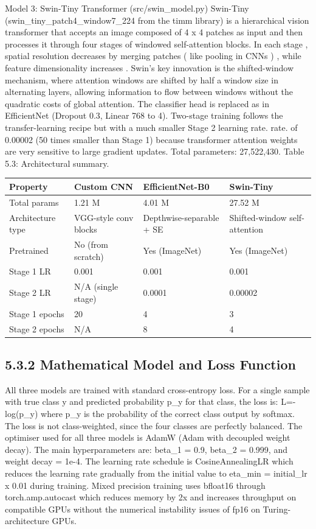 \documentclass[12pt,a4paper,oneside]{report}
\begin{document}
Model 3: Swin-Tiny Transformer (src/swin\_model.py)
Swin-Tiny (swin\_tiny\_patch4\_window7\_224 from the timm library) is a hierarchical vision transformer that accepts an image composed of 4 x 4 patches as input and then processes it through four stages of windowed self-attention blocks. In each stage , spatial resolution decreases by merging patches ( like pooling in CNNs ) , while feature dimensionality increases . Swin's key innovation is the shifted-window mechanism, where attention windows are shifted by half a window size in alternating layers, allowing information to flow between windows without the quadratic costs of global attention.
The classifier head is replaced as in EfficientNet (Dropout 0.3, Linear 768 to 4). Two-stage training follows the transfer-learning recipe but with a much smaller Stage 2 learning rate. rate. of 0.00002 (50 times smaller than Stage 1) because transformer attention weights are very sensitive to large gradient updates. Total parameters: 27,522,430.
Table 5.3: Architectural summary.
\begin{center}
\small
\begin{tabularx}{\textwidth}{YYYY}
\toprule
\textbf{Property} & \textbf{Custom CNN} & \textbf{EfficientNet-B0} & \textbf{Swin-Tiny} \\
\midrule
Total params & 1.21 M & 4.01 M & 27.52 M \\
Architecture type & VGG-style conv blocks & Depthwise-separable + SE & Shifted-window self-attention \\
Pretrained & No (from scratch) & Yes (ImageNet) & Yes (ImageNet) \\
Stage 1 LR & 0.001 & 0.001 & 0.001 \\
Stage 2 LR & N/A (single stage) & 0.0001 & 0.00002 \\
Stage 1 epochs & 20 & 4 & 3 \\
Stage 2 epochs & N/A & 8 & 4 \\
\bottomrule
\end{tabularx}
\end{center}
\subsection{5.3.2 Mathematical Model and Loss Function}
All three models are trained with standard cross-entropy loss. For a single sample with true class y and predicted probability p\_y for that class, the loss is:
    L=-log(p\_y)
where p\_y is the probability of the correct class output by softmax. The loss is not class-weighted, since the four classes are perfectly balanced.
The optimiser used for all three models is AdamW (Adam with decoupled weight decay). The main hyperparameters are: beta\_1 = 0.9, beta\_2 = 0.999, and weight decay = 1e-4. The learning rate schedule is CosineAnnealingLR which reduces the learning rate gradually from the initial value to eta\_min = initial\_lr x 0.01 during training. Mixed precision training uses bfloat16 through torch.amp.autocast which reduces memory by 2x and increases throughput on compatible GPUs without the numerical instability issues of fp16 on Turing-architecture GPUs.
\end{document}
